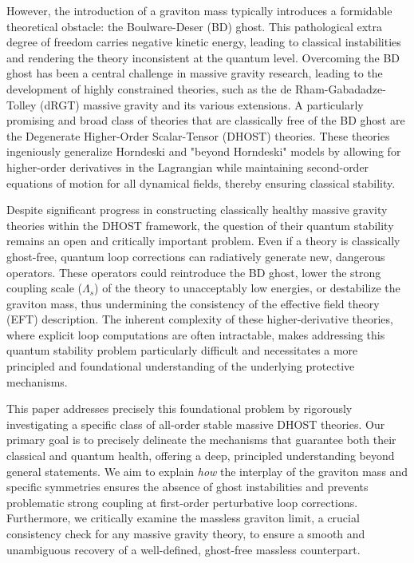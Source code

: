 \documentclass[twocolumn]{aastex631}
\begin{document}
However, the introduction of a graviton mass typically introduces a formidable theoretical obstacle: the Boulware-Deser (BD) ghost. This pathological extra degree of freedom carries negative kinetic energy, leading to classical instabilities and rendering the theory inconsistent at the quantum level. Overcoming the BD ghost has been a central challenge in massive gravity research, leading to the development of highly constrained theories, such as the de Rham-Gabadadze-Tolley (dRGT) massive gravity and its various extensions. A particularly promising and broad class of theories that are classically free of the BD ghost are the Degenerate Higher-Order Scalar-Tensor (DHOST) theories. These theories ingeniously generalize Horndeski and "beyond Horndeski" models by allowing for higher-order derivatives in the Lagrangian while maintaining second-order equations of motion for all dynamical fields, thereby ensuring classical stability.

Despite significant progress in constructing classically healthy massive gravity theories within the DHOST framework, the question of their quantum stability remains an open and critically important problem. Even if a theory is classically ghost-free, quantum loop corrections can radiatively generate new, dangerous operators. These operators could reintroduce the BD ghost, lower the strong coupling scale ($\Lambda_s$) of the theory to unacceptably low energies, or destabilize the graviton mass, thus undermining the consistency of the effective field theory (EFT) description. The inherent complexity of these higher-derivative theories, where explicit loop computations are often intractable, makes addressing this quantum stability problem particularly difficult and necessitates a more principled and foundational understanding of the underlying protective mechanisms.

This paper addresses precisely this foundational problem by rigorously investigating a specific class of all-order stable massive DHOST theories. Our primary goal is to precisely delineate the mechanisms that guarantee both their classical and quantum health, offering a deep, principled understanding beyond general statements. We aim to explain \textit{how} the interplay of the graviton mass and specific symmetries ensures the absence of ghost instabilities and prevents problematic strong coupling at first-order perturbative loop corrections. Furthermore, we critically examine the massless graviton limit, a crucial consistency check for any massive gravity theory, to ensure a smooth and unambiguous recovery of a well-defined, ghost-free massless counterpart.
\end{document}
